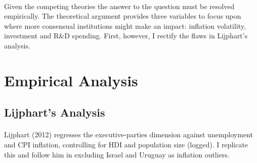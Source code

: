 \documentclass[11pt, oneside]{article}   	%
\let\oldparagraph\paragraph
\renewcommand{\paragraph}[1]{\oldparagraph{#1}\mbox{}}
\begin{document}
\paragraph{}
Given the competing theories the answer to the question must be resolved empirically. The theoretical argument provides three variables to focus upon where more consensual institutions might make an impact: inflation volatility, investment and R\&D spending. First, however, I rectify the flaws in Lijphart’s analysis.

\section{Empirical Analysis}

\subsection{Lijphart's Analysis}

\paragraph{}
Lijphart (2012) regresses the executive-parties dimension against unemployment and CPI inflation, controlling for HDI and population size (logged). I replicate this and follow him in excluding Israel and Uruguay as inflation outliers.
\end{document}

